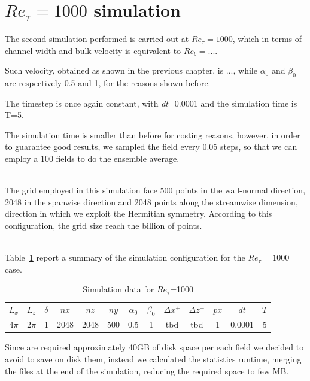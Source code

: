 \section{$Re_{\tau}=1000$ simulation} 
The second simulation performed is carried out at $Re_{\tau}=1000$, which in terms of channel width and bulk velocity is equivalent to $Re_{b}=...$.\par
Such velocity, obtained as shown in the previous chapter, is ..., while $\alpha_{0}$ and $\beta_{0}$ are respectively 0.5 and 1, for the reasons shown before.\par
The timestep is once again constant, with \emph{dt}=0.0001 and the simulation time is T=5. \par
The simulation time is smaller than before for costing reasons, however, in order to guarantee good results, we sampled the field every 0.05 steps, so that we can employ a 100 fields to do the ensemble average.\\~\par
The grid employed in this simulation face 500 points in the wall-normal direction, 2048 in the spanwise direction and 2048 points along the streamwise dimension, direction in which we exploit the Hermitian symmetry. According to this configuration, the grid size reach the billion of points.\\~\par
Table~\ref{table:1000} report a summary of the simulation configuration for the $Re_{\tau}=1000$ case.

\begin{table}[h]
\caption{Simulation data for $Re_{\tau}$=1000}
\begin{center}
\begin{tabular}{ccccccccccccc}
\toprule
$L_{x}$ & $L_{z}$ & $\delta$ & $nx$ & $nz$ & $ny$ & $\alpha_{0}$ & $\beta_{0}$ & $\Delta x^{+}$ & $\Delta z^{+}$ & $px$ & $dt$ & $T$\\
$4\pi$ & $2\pi$ & 1 & 2048 & 2048 & 500 & 0.5 & 1 & tbd  & tbd & 1 & 0.0001 & 5 \\
\bottomrule
\end{tabular}
\end{center}
\label{table:1000}
\end{table}

Since are required approximately 40GB of disk space per each field we decided to avoid to save on disk them, instead we calculated the statistics runtime, merging the files at the end of the simulation, reducing the required space to few MB.\\~\par

